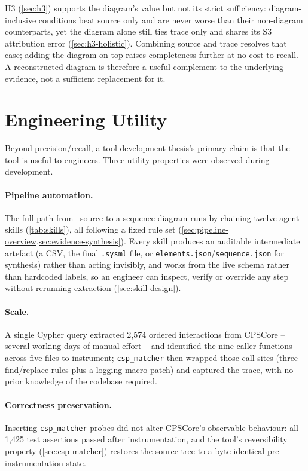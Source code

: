 H3 (\cref{sec:h3}) supports the diagram's value but not its strict
sufficiency: diagram-inclusive conditions beat source only and are
never worse than their non-diagram counterparts, yet the diagram alone
still ties trace only and shares its S3 attribution error
(\cref{sec:h3-holistic}). Combining source and trace resolves that
case; adding the diagram on top raises completeness further at no cost
to recall. A reconstructed diagram is therefore a useful complement to
the underlying evidence, not a sufficient replacement for it.

\section{Engineering Utility}\label{sec:utility}

Beyond precision/recall, a tool development thesis's primary claim is
that the tool is useful to engineers. Three utility properties were
observed during development.

\paragraph{Pipeline automation.} The full path from \Cpp\ source to a
\sysml sequence diagram runs by chaining twelve agent skills
(\cref{tab:skills}), all following a fixed rule set
(\cref{sec:pipeline-overview,sec:evidence-synthesis}). Every skill
produces an auditable intermediate artefact (a CSV, the final
\texttt{.sysml} file, or \texttt{elements.json}/\texttt{sequence.json}
for synthesis) rather than acting invisibly, and works from the live
schema rather than hardcoded labels, so an engineer can inspect, verify
or override any step without rerunning extraction
(\cref{sec:skill-design}).

\paragraph{Scale.} A single Cypher query extracted 2,574 ordered
interactions from CPSCore -- several working days of manual effort --
and identified the nine caller functions across five files to
instrument; \texttt{csp\_matcher} then wrapped those call sites (three
find/replace rules plus a logging-macro patch) and captured the trace,
with no prior knowledge of the codebase required.

\paragraph{Correctness preservation.} Inserting \texttt{csp\_matcher}
probes did not alter CPSCore's observable behaviour: all 1,425 test
assertions passed after instrumentation, and the tool's reversibility
property (\cref{sec:csp-matcher}) restores the source tree to a
byte-identical pre-instrumentation state.

